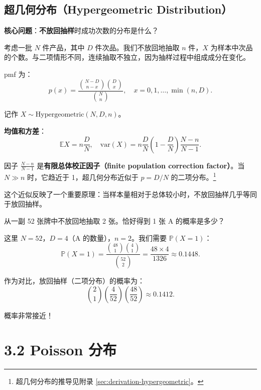 \subsection{超几何分布（Hypergeometric Distribution）}\label{sub:hypergeometric-ch3}

\textbf{核心问题}：\textbf{不放回抽样}时成功次数的分布是什么？

考虑一批 $N$ 件产品，其中 $D$ 件次品。我们不放回地抽取 $n$ 件，$X$ 为样本中次品的个数。与二项情形不同，连续抽取不独立，因为抽样过程中组成成分在变化。

pmf 为：
\begin{equation}\label{eq:hypergeometric-pmf-ch3}
p(x) = \frac{\binom{N-D}{n-x}\binom{D}{x}}{\binom{N}{n}}, \quad x = 0, 1, \ldots, \min(n, D).
\end{equation}

记作 $X \sim \text{Hypergeometric}(N, D, n)$。

\textbf{均值和方差}：
\begin{equation}\label{eq:hypergeometric-moments-ch3}
\mathbb{E}X = n\frac{D}{N}, \quad \text{var}(X) = n\frac{D}{N}\left(1-\frac{D}{N}\right)\frac{N-n}{N-1}.
\end{equation}

因子 $\frac{N-n}{N-1}$ 是\textbf{有限总体校正因子（finite population correction factor）}。当 $N \gg n$ 时，它趋近于 1，超几何分布近似于 $p = D/N$ 的二项分布。\footnote{超几何分布的推导见附录 \cref{sec:derivation-hypergeometric}。}

这个近似反映了一个重要原理：当样本量相对于总体较小时，不放回抽样几乎等同于放回抽样。

\begin{example}[抽牌]\label{ex:hypergeometric-cards-ch3}
从一副 52 张牌中不放回地抽取 2 张。恰好得到 1 张 A 的概率是多少？

这里 $N=52$，$D=4$（A 的数量），$n=2$。我们需要 $\mathbb{P}(X=1)$：
\[
\mathbb{P}(X=1) = \frac{\binom{48}{1}\binom{4}{1}}{\binom{52}{2}} = \frac{48 \times 4}{1326} \approx 0.1448.
\]

作为对比，放回抽样（二项分布）的概率为：
\[
\binom{2}{1}\left(\frac{4}{52}\right)\left(\frac{48}{52}\right) \approx 0.1412.
\]

概率非常接近！
\end{example}

\section{3.2 Poisson 分布}\label{sec:poisson-distribution-ch3}

